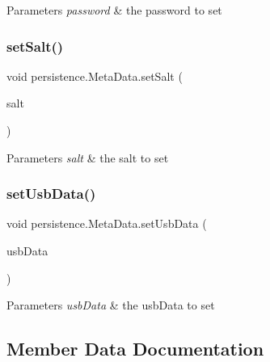 \begin{DoxyParams}{Parameters}
{\em password} & the password to set \\
\hline
\end{DoxyParams}
\mbox{\label{classpersistence_1_1_meta_data_a5fc10b0100b0ba35fdcd9806c0dd2486}} 
\subsubsection{\texorpdfstring{set\+Salt()}{setSalt()}}
{\footnotesize\ttfamily void persistence.\+Meta\+Data.\+set\+Salt (\begin{DoxyParamCaption}\item[{byte \mbox{[}$\,$\mbox{]}}]{salt }\end{DoxyParamCaption})}


\begin{DoxyParams}{Parameters}
{\em salt} & the salt to set \\
\hline
\end{DoxyParams}
\mbox{\label{classpersistence_1_1_meta_data_a5fdfe20c91b05af14d85f778b4862962}} 
\subsubsection{\texorpdfstring{set\+Usb\+Data()}{setUsbData()}}
{\footnotesize\ttfamily void persistence.\+Meta\+Data.\+set\+Usb\+Data (\begin{DoxyParamCaption}\item[{\mbox{\hyperlink{classpersistence_1_1_u_s_b_meta_data}{U\+S\+B\+Meta\+Data}}}]{usb\+Data }\end{DoxyParamCaption})}


\begin{DoxyParams}{Parameters}
{\em usb\+Data} & the usb\+Data to set \\
\hline
\end{DoxyParams}


\subsection{Member Data Documentation}
\mbox{\label{classpersistence_1_1_meta_data_a9f43ee5f622a5634c751d027ab64287e}} 
